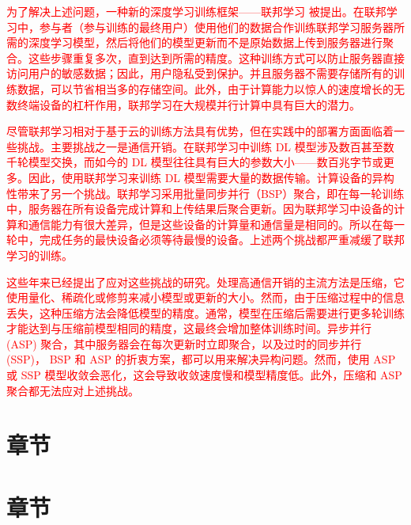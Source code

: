 \documentclass[winfonts,master,twoside]{njuthesis}
\begin{document}
\textcolor{red}{为了解决上述问题，一种新的深度学习训练框架——联邦学习\cite{DBLP:conf/aistats/McMahanMRHA17} 被提出。在联邦学习中，参与者（参与训练的最终用户）使用他们的数据合作训练联邦学习服务器所需的深度学习模型，然后将他们的模型更新而不是原始数据上传到服务器进行聚合。这些步骤重复多次，直到达到所需的精度。这种训练方式可以防止服务器直接访问用户的敏感数据；因此，用户隐私受到保护。并且服务器不需要存储所有的训练数据，可以节省相当多的存储空间。此外，由于计算能力以惊人的速度增长的无数终端设备的杠杆作用，联邦学习在大规模并行计算中具有巨大的潜力。}

\textcolor{red}{尽管联邦学习相对于基于云的训练方法具有优势，但在实践中的部署方面面临着一些挑战。主要挑战之一是通信开销。在联邦学习中训练 DL 模型涉及数百甚至数千轮模型交换，而如今的 DL 模型往往具有巨大的参数大小——数百兆字节或更多。因此，使用联邦学习来训练 DL 模型需要大量的数据传输。计算设备的异构性带来了另一个挑战。联邦学习采用批量同步并行（BSP）聚合，即在每一轮训练中，服务器在所有设备完成计算和上传结果后聚合更新。因为联邦学习中设备的计算和通信能力有很大差异，但是这些设备的计算量和通信量是相同的。所以在每一轮中，完成任务的最快设备必须等待最慢的设备。上述两个挑战都严重减缓了联邦学习的训练。}

\textcolor{red}{这些年来已经提出了应对这些挑战的研究。处理高通信开销的主流方法是压缩\cite{DBLP:journals/corr/KonecnyMYRSB16}\cite{DBLP:conf/iclr/LinHM0D18}\cite{DBLP:conf/icml/TangYLZL19}\cite{DBLP:conf/ nips/VogelsKJ19}\cite{DBLP:journals/corr/IandolaMAHDK16}\cite{DBLP:conf/iclr/PolinoPA18}，它使用量化、稀疏化或修剪来减小模型或更新的大小。然而，由于压缩过程中的信息丢失，这种压缩方法会降低模型的精度。通常，模型在压缩后需要进行更多轮训练才能达到与压缩前模型相同的精度，这最终会增加整体训练时间。异步并行 (ASP) 聚合\cite{DBLP:conf/hotos/CiparHKLGGKX13}，其中服务器会在每次更新时立即聚合，以及过时的同步并行 (SSP)\cite{DBLP:conf/cloud/HarlapCDWGGGX16}， BSP 和 ASP 的折衷方案，都可以用来解决异构问题。然而，使用 ASP 或 SSP 模型收敛会恶化，这会导致收敛速度慢和模型精度低。此外，压缩和 ASP 聚合都无法应对上述挑战。}
\section{章节}\label{subsec:mptcp_conges}
\lipsum[1]

\section{章节}
\lipsum[1]
\end{document}
